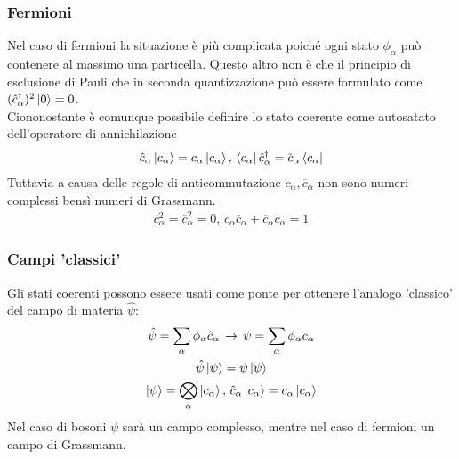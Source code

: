 \documentclass{beamer}
\begin{document}
\begin{frame}
  \frametitle{Fermioni}
  Nel caso di fermioni la situazione è più complicata poiché ogni stato $\phi_\alpha$ può contenere al massimo una particella. Questo altro non è che il principio di esclusione di Pauli che in seconda quantizzazione può essere formulato come $(\hat{c}_\alpha^\dagger)^2 \ket{0} = 0$.\\
  Ciononostante è comunque possibile definire lo stato coerente come autosatato dell'operatore di annichilazione
  \begin{gather*}
    \hat{c}_\alpha \ket{c_\alpha} = c_\alpha \ket{c_\alpha}, \,
    \bra{c_\alpha} \hat{c}_\alpha^\dagger  = \overbar{c}_\alpha \bra{c_\alpha}
  \end{gather*}
  Tuttavia a causa delle regole di anticommutazione $c_\alpha,\overbar{c}_\alpha$ non sono numeri complessi bensì numeri di Grassmann.
  \begin{gather*}
    c_\alpha^2 = \overbar{c}_\alpha^2 = 0, \, c_\alpha\overbar{c}_\alpha + \overbar{c}_\alpha c_\alpha = 1
  \end{gather*}
\end{frame}

\begin{frame}
  \frametitle{Campi 'classici'}
  Gli stati coerenti possono essere usati come ponte per ottenere l'analogo 'classico' del campo di materia $\hat{\psi}$:
  \begin{gather*}
    \hat{\psi} = \sum_\alpha \phi_\alpha \hat{c}_\alpha \, \to \, \psi = \sum_\alpha \phi_\alpha c_\alpha\\
    \hat{\psi}\ket{\psi} = \psi\ket{\psi}\\
    \ket{\psi} = \bigotimes_\alpha \ket{c_\alpha}, \, \hat{c}_\alpha \ket{c_\alpha} = c_\alpha \ket{c_\alpha}
  \end{gather*}
  Nel caso di bosoni $\psi$ sarà un campo complesso, mentre nel caso di fermioni un campo di Grassmann.
\end{frame}
\end{document}
